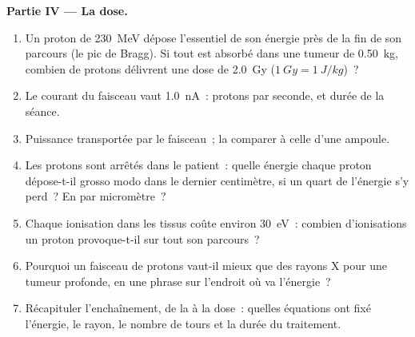 \begin{problem}
\medskip
\noindent\textbf{Partie IV --- La dose.}
\begin{enumerate}[resume]
  \item Un proton de \qty{230}{MeV} dépose l'essentiel de son énergie
        près de la fin de son parcours (le pic de Bragg). Si tout est
        absorbé dans une tumeur de \qty{0.50}{kg}, combien de protons
        délivrent une dose de \qty{2.0}{Gy} ($\qty{1}{Gy} = \qty{1}{J/kg}$)~?
  \item Le courant du faisceau vaut \qty{1.0}{nA}~: protons par seconde,
        et durée de la séance.
  \item Puissance transportée par le faisceau~; la comparer à celle d'une
        ampoule.
  \item Les protons sont arrêtés dans le patient~: quelle énergie chaque
        proton dépose-t-il grosso modo dans le dernier centimètre, si un
        quart de l'énergie s'y perd~? En  par micromètre~?
  \item Chaque ionisation dans les tissus coûte environ \qty{30}{eV}~:
        combien d'ionisations un proton provoque-t-il sur tout son
        parcours~?
  \item Pourquoi un faisceau de protons vaut-il mieux que des rayons X
        pour une tumeur profonde, en une phrase sur l'endroit où va
        l'énergie~?
  \item Récapituler l'enchaînement, de la  à la dose~:
        quelles équations ont fixé l'énergie, le rayon, le nombre de tours
        et la durée du traitement.
\end{enumerate}
\end{problem}
